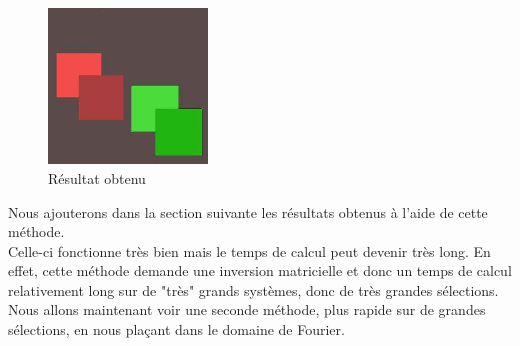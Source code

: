 \begin{figure}[!h]
    \centering
\includegraphics[width = 120pt]{Images/result.png}
\caption{Résultat obtenu}\hfill
\end{figure} 
Nous ajouterons dans la section suivante les résultats obtenus à l'aide de cette méthode. \\ Celle-ci fonctionne très bien mais le temps de calcul peut devenir très long. En effet, cette méthode demande une inversion matricielle et donc un temps de calcul relativement long sur de "très" grands systèmes, donc de très grandes sélections. Nous allons maintenant voir une seconde méthode, plus rapide sur de grandes sélections, en nous plaçant dans le domaine de Fourier.

